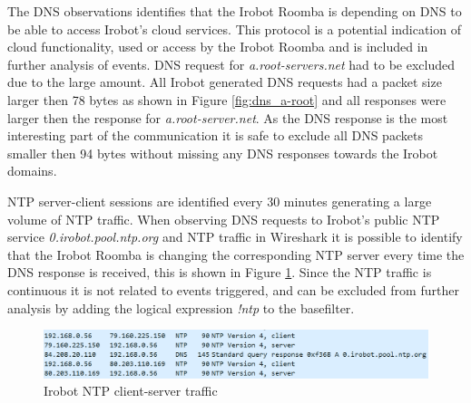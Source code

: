 The \gls{DNS} observations identifies that the Irobot Roomba is depending on \gls{DNS} to be able to access Irobot's cloud services. This protocol is a potential indication of cloud functionality, used or access by the Irobot Roomba and is included in further analysis of events. \gls{DNS} request for \textit{a.root-servers.net} had to be excluded due to the large amount. All Irobot generated \gls{DNS} requests had a packet size larger then 78 bytes as shown in Figure \ref{fig:dns_a-root} and all responses were larger then the response for \textit{a.root-server.net}. As the \gls{DNS} response is the most interesting part of the communication it is safe to exclude all \gls{DNS} packets smaller then 94 bytes without missing any \gls{DNS} responses towards the Irobot domains. 

\gls{NTP} server-client sessions are identified every 30 minutes generating a large volume of \gls{NTP} traffic. When observing \gls{DNS} requests to Irobot's public \gls{NTP} service \textit{0.irobot.pool.ntp.org} and \gls{NTP} traffic in Wireshark it is possible to identify that the Irobot Roomba is changing the corresponding \gls{NTP} server every time the \gls{DNS} response is received, this is shown in Figure \ref{fig:irobot_ntp_dns}. Since the \gls{NTP} traffic is continuous it is not related to events triggered, and can be excluded from further analysis by adding the logical expression \textit{!ntp} to the basefilter.

\begin{figure}[H]
    \centering
    \includegraphics[width=\textwidth]{figures/NTP-irobot.png}
    \caption{Irobot NTP client-server traffic}
    \label{fig:irobot_ntp_dns}
\end{figure}

